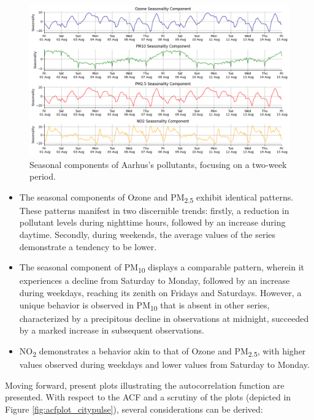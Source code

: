 \begin{figure}[h]
    \centering
    \includegraphics[width=1\linewidth]{images/citypulse_seasonality.png}
    \caption{Seasonal components of Aarhus's pollutants, focusing on a two-week period.}
    \label{fig:seasonality_aarhus}
\end{figure}

\begin{itemize}
\item The seasonal components of Ozone and PM\textsubscript{2.5} exhibit identical patterns. These patterns manifest in two discernible trends: firstly, a reduction in pollutant levels during nighttime hours, followed by an increase during daytime. Secondly, during weekends, the average values of the series demonstrate a tendency to be lower.
\item The seasonal component of PM\textsubscript{10} displays a comparable pattern, wherein it experiences a decline from Saturday to Monday, followed by an increase during weekdays, reaching its zenith on Fridays and Saturdays. However, a unique behavior is observed in PM\textsubscript{10} that is absent in other series, characterized by a precipitous decline in observations at midnight, succeeded by a marked increase in subsequent observations.
\item NO\textsubscript{2} demonstrates a behavior akin to that of Ozone and PM\textsubscript{2.5}, with higher values observed during weekdays and lower values from Saturday to Monday.
\end{itemize}

Moving forward, present plots illustrating the autocorrelation function are presented. With respect to the ACF and a scrutiny of the plots (depicted in Figure \ref{fig:acfplot_citypulse}), several considerations can be derived:

